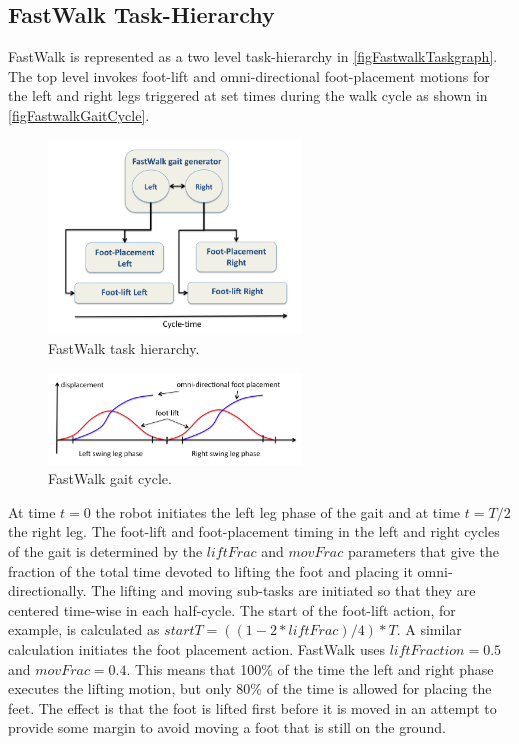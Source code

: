 \documentclass[pdftex,11pt,a4paper]{report}
\begin{document}
\subsection{FastWalk Task-Hierarchy}\label{sectionFastwalkTaskHierarchy}
FastWalk is represented as a two level task-hierarchy in \autoref{figFastwalkTaskgraph}. The top level invokes foot-lift and omni-directional foot-placement motions for the left and right legs triggered at set times during the walk cycle as shown in \autoref{figFastwalkGaitCycle}.
\begin{figure}[ht]
\centering
\includegraphics[width=0.6\textwidth]{figures/FastwalkTaskgraph}
\caption{FastWalk task hierarchy.} \label{figFastwalkTaskgraph}
\end{figure} 

\begin{figure}[ht]
\centering
\includegraphics[width=0.6\textwidth]{figures/FastwalkGaitCycle}
\caption{FastWalk gait cycle.} \label{figFastwalkGaitCycle}
\end{figure} 

At time $t=0$ the robot initiates the left leg phase of the gait and at time $t=T/2$ the right leg. The foot-lift and foot-placement timing in the left and right cycles of the gait is determined by the $liftFrac$ and $movFrac$ parameters that give the fraction of the total time devoted to lifting the foot and placing it omni-directionally. The lifting and moving sub-tasks are initiated so that they are centered time-wise in each half-cycle. The start of the foot-lift action, for example, is calculated as  $startT = ((1-2*liftFrac)/4)*T$. A similar calculation initiates the foot placement action.  FastWalk uses $liftFraction = 0.5$ and $movFrac = 0.4$. This means that 100\% of the time the left and right phase executes the lifting motion, but only 80\% of the time is allowed for placing the feet. The effect is that the foot is lifted first before it is moved in an attempt to provide some margin to avoid moving a foot that is still on the ground. 
\end{document}
